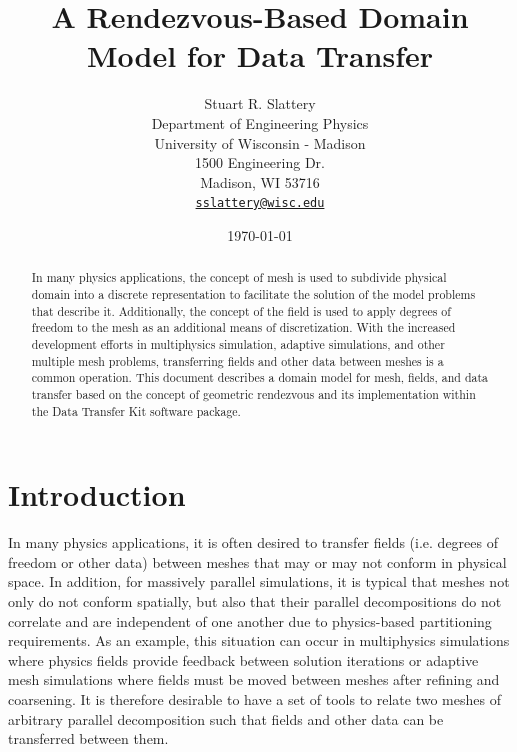 \documentclass[letterpaper,12pt]{article}
\author{
  Stuart R. Slattery\\
  Department of Engineering Physics\\
  University of Wisconsin - Madison\\
  1500 Engineering Dr.\\
  Madison, WI 53716 \\
  \href{mailto:sslattery@wisc.edu}{\texttt{sslattery@wisc.edu}}
}
\date{\today}
\title{A Rendezvous-Based Domain Model for Data Transfer}
\begin{document}
\maketitle

\newpage

\begin{abstract}
  In many physics applications, the concept of mesh is used to
  subdivide physical domain into a discrete representation to
  facilitate the solution of the model problems that describe
  it. Additionally, the concept of the field is used to apply degrees
  of freedom to the mesh as an additional means of
  discretization. With the increased development efforts in
  multiphysics simulation, adaptive simulations, and other multiple
  mesh problems, transferring fields and other data between meshes is
  a common operation. This document describes a domain model for mesh,
  fields, and data transfer based on the concept of geometric
  rendezvous and its implementation within the Data Transfer Kit
  software package.
\end{abstract}

\newpage
\newpage

\tableofcontents
\clearpage
\listoffigures
\clearpage
\listoftables
\newpage
\newpage

\section{Introduction}\label{sec:intro}
In many physics applications, it is often desired to transfer fields
(i.e. degrees of freedom or other data) between meshes that may or may
not conform in physical space. In addition, for massively parallel
simulations, it is typical that meshes not only do not conform
spatially, but also that their parallel decompositions do not
correlate and are independent of one another due to physics-based
partitioning requirements. As an example, this situation can occur in
multiphysics simulations where physics fields provide feedback between
solution iterations or adaptive mesh simulations where fields must be
moved between meshes after refining and coarsening. It is therefore
desirable to have a set of tools to relate two meshes of arbitrary
parallel decomposition such that fields and other data can be
transferred between them.
\end{document}
